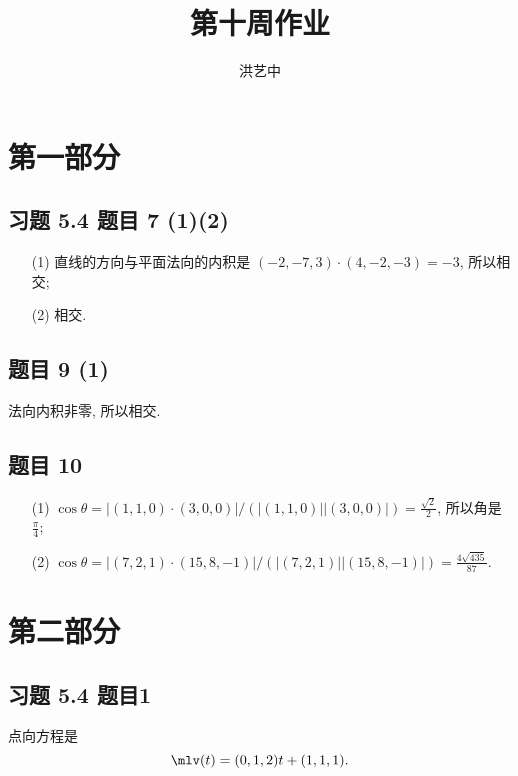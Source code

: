\title{第十周作业}
\author{洪艺中}
\maketitle
\section{第一部分}
\newcommand{\lvec}[1]{\overrightarrow{#1}}

\subsection*{ 习题 5.4 题目 7 (1)(2) }
\begin{solution}
\begin{enumerate}
    \item[(1)] 直线的方向与平面法向的内积是 $(-2, -7, 3) \cdot (4, -2, -3) = -3$, 所以相交;
    \item[(2)] 相交.  
\end{enumerate}
\end{solution}

\subsection*{ 题目 9 (1) }
\begin{solution}
法向内积非零, 所以相交.
\end{solution}

\subsection*{ 题目 10 }
\begin{solution}
\begin{enumerate}
    \item[(1)] $\cos \theta = |(1, 1, 0) \cdot (3, 0, 0)| / (|(1, 1, 0)||(3, 0, 0)|) = \frac{\sqrt{2}}{2}$, 所以角是 $\frac{\pi}{4}$;
    \item[(2)] $\cos \theta = |(7, 2, 1) \cdot (15, 8, -1)| / (|(7, 2, 1)||(15, 8, -1)|) = \frac{4\sqrt{435}}{87}$.
\end{enumerate}
\end{solution}

\section{第二部分}

\subsection*{ 习题 5.4 题目1 }
\begin{solution}
    点向方程是
\[
\mlv(t) = (0, 1, 2)t + (1, 1, 1).
\]
\end{solution}


